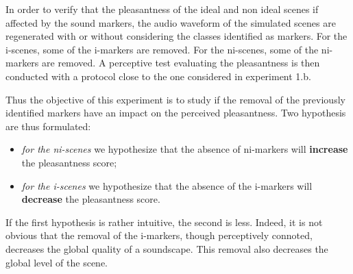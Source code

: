 \documentclass[twoside,twocolumn]{article}
\begin{document}
In order to verify that the pleasantness of the ideal and non ideal scenes if affected by the sound markers, the audio waveform of the simulated scenes are regenerated with or without considering the classes identified as markers. For the i-scenes, some of the i-markers are removed. For the ni-scenes, some of the ni-markers are removed. A perceptive test evaluating the pleasantness is then conducted with a protocol close to the one considered in experiment 1.b.


Thus the objective of this experiment is to study if the removal of the previously identified markers have an impact on the perceived pleasantness. Two hypothesis are thus formulated:


\begin{itemize}
\item \emph{for the ni-scenes} we hypothesize that the absence of ni-markers will \textbf{increase} the pleasantness score;
\item \emph{for the i-scenes} we hypothesize that the absence of the i-markers will \textbf{decrease} the pleasantness score.
\end{itemize}


If the first hypothesis is rather intuitive, the second is less. Indeed, it is not obvious that the removal of the i-markers, though perceptively connoted, decreases the global quality of a soundscape. This removal also decreases the global level of the scene.

\end{document}
